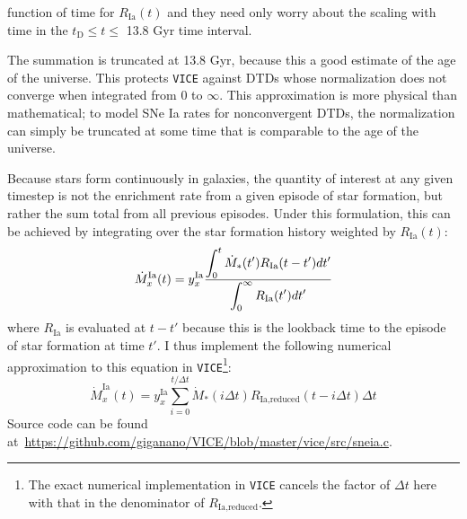 \documentclass{report}
\newcommand\ddfrac[2]{\frac{\displaystyle #1}{\displaystyle #2}}
\begin{document}
function of time for $R_\text{Ia}(t)$ and they need only worry about the 
scaling with time in the $t_\text{D} \leq t \leq$ 13.8 Gyr time interval. 
\par
The summation is truncated at 13.8 Gyr, because this a good estimate of the 
age of the universe. This protects \texttt{VICE} against DTDs whose 
normalization does not converge when integrated from 0 to $\infty$. This 
approximation is more physical than mathematical; to model SNe Ia rates for 
nonconvergent DTDs, the normalization can simply be truncated at some time that 
is comparable to the age of the universe. 
\par 
Because stars form continuously in galaxies, the quantity of interest at any 
given timestep is not the enrichment rate from a given episode of star 
formation, but rather the sum total from all previous episodes. Under this 
formulation, this can be achieved by integrating over the star formation 
history weighted by $R_\text{Ia}(t)$: 
\begin{equation}
\dot{M}_x^\text{Ia}(t) = y_x^\text{Ia}\ddfrac{
	\int_0^t \dot{M}_*(t')R_\text{Ia}(t - t')dt' 
}{
	\int_0^\infty R_\text{Ia}(t')dt'
} \\ 
\end{equation}
where $R_\text{Ia}$ is evaluated at $t - t'$ because this is the lookback time 
to the episode of star formation at time $t'$. I thus implement the following 
numerical approximation to this equation in \texttt{VICE}\footnote{
	The exact numerical implementation in \texttt{VICE} cancels the factor of 
	$\Delta t$ here with that in the denominator of $R_\text{Ia,reduced}$. 
}: 
\begin{equation}
\dot{M}_x^\text{Ia}(t) = y_x^\text{Ia}\sum_{i = 0}^{t/\Delta t} 
\dot{M}_*(i\Delta t)R_\text{Ia,reduced}(t - i\Delta t)\Delta t
\end{equation}
Source code can be found 
at~\url{https://github.com/giganano/VICE/blob/master/vice/src/sneia.c}. 
\end{document}
